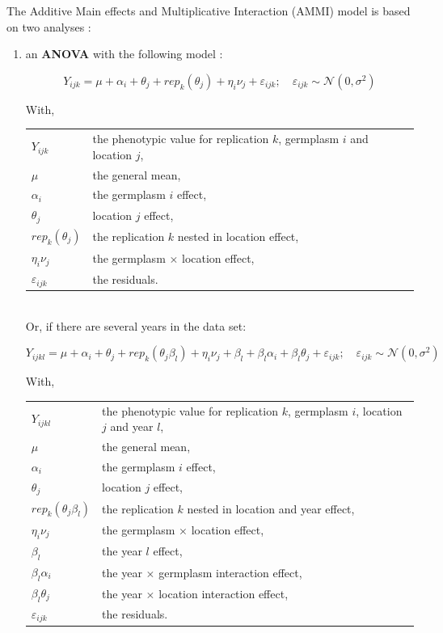\documentclass{article}\usepackage[]{graphicx}\usepackage[]{color}
\begin{document}
The Additive Main effects and Multiplicative Interaction (AMMI) model is based on two analyses \citep{gauch_statistical_2006} : 
\begin{enumerate}

\item an \textbf{ANOVA} with the following model :

\begin{equation}
Y_{ijk} = \mu + \alpha_{i} + \theta_{j} + rep_{k}(\theta_{j}) + \eta_{i}\nu_{j} + \varepsilon_{ijk}; \quad \varepsilon_{ijk} \sim \mathcal{N} (0,\sigma^2)
\label{ammi_anova}
\end{equation}

With,

\begin{tabular}{ll}
$Y_{ijk}$ & the phenotypic value for replication $k$, germplasm $i$ and location $j$, \\
$\mu$ & the general mean, \\
$\alpha_{i}$ & the germplasm $i$ effect, \\
$\theta_{j}$ & location $j$ effect, \\
$rep_{k}(\theta_{j})$ & the replication $k$ nested in location effect, \\
$\eta_{i}\nu_{j}$ & the germplasm $\times$ location effect, \\
$\varepsilon_{ijk}$ & the residuals.\\
\end{tabular}

~\\ 

Or, if there are several years in the data set:

\begin{equation}
Y_{ijkl} = \mu + \alpha_{i} + \theta_{j} + rep_{k}(\theta_{j}\beta_{l}) + \eta_{i}\nu_{j} + 
\beta_{l} + \beta_{l}\alpha_{i} + \beta_{l}\theta_{j} + 
\varepsilon_{ijk}; \quad \varepsilon_{ijk} \sim \mathcal{N} (0,\sigma^2)
\label{ammi_anova}
\end{equation}

With,

\begin{tabular}{ll}
$Y_{ijkl}$ & the phenotypic value for replication $k$, germplasm $i$, location $j$ and year $l$, \\
$\mu$ & the general mean, \\
$\alpha_{i}$ & the germplasm $i$ effect, \\
$\theta_{j}$ & location $j$ effect, \\
$rep_{k}(\theta_{j}\beta_{l})$ & the replication $k$ nested in location and year effect, \\
$\eta_{i}\nu_{j}$ & the germplasm $\times$ location effect, \\
$\beta_{l}$ & the year $l$ effect, \\
$\beta_{l}\alpha_{i}$ & the year $\times$ germplasm interaction effect, \\
$\beta_{l}\theta_{j}$ & the year $\times$ location interaction effect, \\
$\varepsilon_{ijk}$ & the residuals.\\
\end{tabular}



\end{enumerate}
\end{document}
